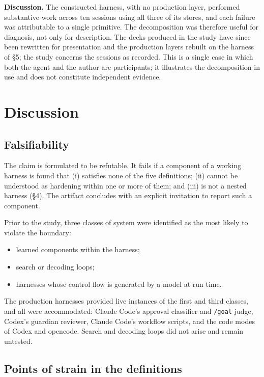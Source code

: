 \textbf{Discussion.} The constructed harness, with no production layer, performed substantive work across ten sessions using all three of its stores, and each failure was attributable to a single primitive. The decomposition was therefore useful for diagnosis, not only for description. The decks produced in the study have since been rewritten for presentation and the production layers rebuilt on the harness of §5; the study concerns the sessions as recorded. This is a single case in which both the agent and the author are participants; it illustrates the decomposition in use and does not constitute independent evidence.

\section{Discussion}

\subsection{Falsifiability}

The claim is formulated to be refutable. It fails if a component of a working harness is found that (i) satisfies none of the five definitions; (ii) cannot be understood as hardening within one or more of them; and (iii) is not a nested harness (§4). The artifact concludes with an explicit invitation to report such a component.

Prior to the study, three classes of system were identified as the most likely to violate the boundary:

\begin{itemize}
\tightlist
\item
  learned components within the harness;
\item
  search or decoding loops;
\item
  harnesses whose control flow is generated by a model at run time.
\end{itemize}

The production harnesses provided live instances of the first and third classes, and all were accommodated: Claude Code's approval classifier and \passthrough{\lstinline!/goal!} judge, Codex's guardian reviewer, Claude Code's workflow scripts, and the code modes of Codex and opencode. Search and decoding loops did not arise and remain untested.

\subsection{Points of strain in the definitions}

